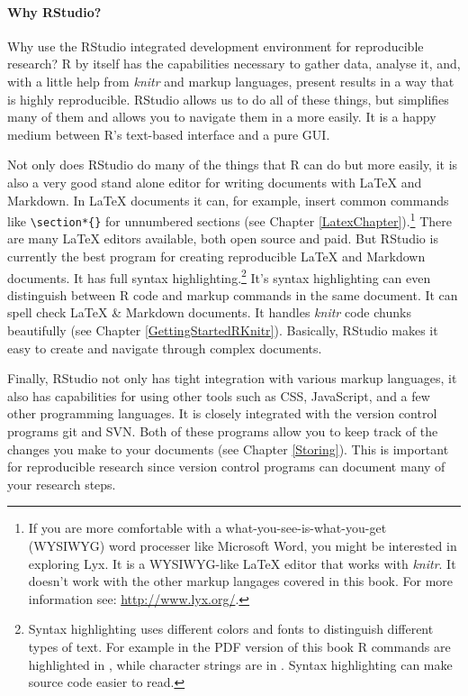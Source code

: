 \paragraph{Why RStudio?}

Why use the RStudio \cite[]{RStudioCite} integrated development environment for reproducible research? R by itself has the capabilities necessary to gather data, analyse it, and, with a little help from {\emph{knitr}} and markup languages, present results in a way that is highly reproducible. RStudio allows us to do all of these things, but simplifies many of them and allows you to navigate them in a more easily. It is a happy medium between R's text-based interface and a pure GUI. 

Not only does RStudio do many of the things that R can do but more easily, it is also a very good stand alone editor for writing documents with LaTeX and Markdown. In LaTeX documents it can, for example, insert common commands like \texttt{\textbackslash{}section*\{\}} for unnumbered sections (see Chapter \ref{LatexChapter}).\footnote{If you are more comfortable with a what-you-see-is-what-you-get (WYSIWYG) word processer like Microsoft Word, you might be interested in exploring Lyx. It is a WYSIWYG-like LaTeX editor that works with {\emph{knitr}}. It doesn't work with the other markup langages covered in this book. For more information see: \url{http://www.lyx.org/}.}  There are many LaTeX editors available, both open source and paid. But RStudio is currently the best program for creating reproducible LaTeX and Markdown documents. It has full syntax highlighting.\footnote{Syntax highlighting uses different colors and fonts to distinguish different types of text. For example in the PDF version of this book R commands are highlighted in , while character strings are in . Syntax highlighting can make source code easier to read.} It's syntax highlighting can even distinguish between R code and markup commands in the same document. It can spell check LaTeX \& Markdown documents. It handles {\emph{knitr}} code chunks beautifully (see Chapter \ref{GettingStartedRKnitr}). Basically, RStudio makes it easy to create and navigate through complex documents. 

Finally, RStudio not only has tight integration with various markup languages, it also has capabilities for using other tools such as CSS, JavaScript, and a few other programming languages. It is closely integrated with the version control programs git and SVN. Both of these programs allow you to keep track of the changes you make to your documents (see Chapter \ref{Storing}). This is important for reproducible research since version control programs can document many of your research steps. 

